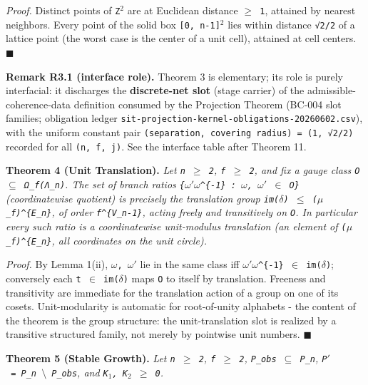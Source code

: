 \documentclass[
  american,
  11pt,
  letterpaper,
]{article}
\begin{document}
\emph{Proof.} Distinct points of \texttt{Z\ensuremath{{}^{2}}} are at Euclidean distance \texttt{\ensuremath{\geq}\ 1}, attained by nearest neighbors. Every point of the solid box \texttt{{[}0,\ n-1{]}\ensuremath{{}^{2}}} lies within distance \texttt{√2/2} of a lattice point (the worst case is the center of a unit cell), attained at cell centers. \ensuremath{\blacksquare}

\textbf{Remark R3.1 (interface role).} Theorem 3 is elementary; its role is purely interfacial: it discharges the \textbf{discrete-net slot} (stage carrier) of the admissible-coherence-data definition consumed by the Projection Theorem (BC-004 slot families; obligation ledger \nolinkurl{sit-projection-kernel-obligations-20260602.csv}), with the uniform constant pair \texttt{(separation,\ covering\ radius)\ =\ (1,\ √2/2)} recorded for all \texttt{(n,\ f,\ j)}. See the interface table after Theorem 11.

\textbf{Theorem 4 (Unit Translation).} \emph{Let \texttt{n\ \ensuremath{\geq}\ 2}, \texttt{f\ \ensuremath{\geq}\ 2}, and fix a gauge class \texttt{O\ \ensuremath{\subseteq}\ Ω\_f(Λ\_n)}. The set of branch ratios \texttt{\{\ensuremath{\omega}\ensuremath{'}\ensuremath{\omega}\^{}\{-1\}\ :\ \ensuremath{\omega},\ \ensuremath{\omega}\ensuremath{'}\ \ensuremath{\in}\ O\}} (coordinatewise quotient) is precisely the translation group \texttt{im(\ensuremath{\delta})\ \ensuremath{\leq}\ (\ensuremath{\mu}\_f)\^{}\{E\_n\}}, of order \texttt{f\^{}\{\textbar{}V\_n\textbar{}-1\}}, acting freely and transitively on \texttt{O}. In particular every such ratio is a coordinatewise unit-modulus translation (an element of \texttt{(\ensuremath{\mu}\_f)\^{}\{E\_n\}}, all coordinates on the unit circle).}

\emph{Proof.} By Lemma 1(ii), \texttt{\ensuremath{\omega},\ \ensuremath{\omega}\ensuremath{'}} lie in the same class iff \texttt{\ensuremath{\omega}\ensuremath{'}\ensuremath{\omega}\^{}\{-1\}\ \ensuremath{\in}\ im(\ensuremath{\delta})}; conversely each \texttt{t\ \ensuremath{\in}\ im(\ensuremath{\delta})} maps \texttt{O} to itself by translation. Freeness and transitivity are immediate for the translation action of a group on one of its cosets. Unit-modularity is automatic for root-of-unity alphabets - the content of the theorem is the group structure: the unit-translation slot is realized by a transitive structured family, not merely by pointwise unit numbers. \ensuremath{\blacksquare}

\textbf{Theorem 5 (Stable Growth).} \emph{Let \texttt{n\ \ensuremath{\geq}\ 2}, \texttt{f\ \ensuremath{\geq}\ 2}, \texttt{P\_obs\ \ensuremath{\subseteq}\ P\_n}, \texttt{P\ensuremath{'}\ =\ P\_n\ \ensuremath{\setminus}\ P\_obs}, and \texttt{K\ensuremath{{}_{1}},\ K\ensuremath{{}_{2}}\ \ensuremath{\geq}\ 0}.}
\end{document}
